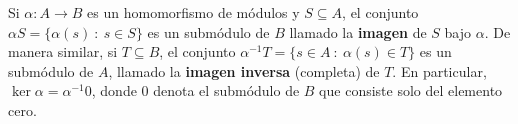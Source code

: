 Si \(\alpha: A \rightarrow B\) es un homomorfismo de módulos y \(S \subseteq A\), el conjunto \(\alpha S = \{\alpha(s) \ : \ s \in S \} \) es un submódulo de \(B\) llamado la \textbf{imagen} de \(S\) bajo \(\alpha\). De manera similar, si \(T \subseteq B\), el conjunto \(\alpha^{-1}T = \{ s \in A \ : \ \alpha(s) \in T \} \) es un submódulo de \(A\), llamado la \textbf{imagen inversa} (completa) de \(T\). En particular, \(\ker \alpha = \alpha^{-1}0\), donde \(0\) denota el submódulo de \(B\) que consiste solo del elemento cero.
%
%
%
%
%

